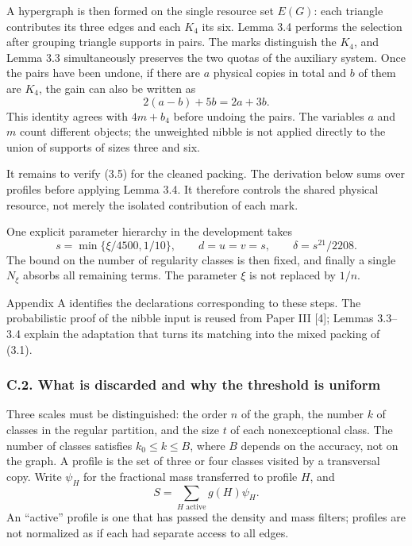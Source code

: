 \documentclass[english,11pt,a4paper]{article}
\newcounter{none}
\begin{document}
A hypergraph is then formed on the single resource set \(E(G)\): each triangle contributes its three edges and each \(K_4\) its six. Lemma 3.4 performs the selection after grouping triangle supports in pairs. The marks distinguish the \(K_4\), and Lemma 3.3 simultaneously preserves the two quotas of the auxiliary system. Once the pairs have been undone, if there are \(a\) physical copies in total and \(b\) of them are \(K_4\), the gain can also be written as \[
2(a-b)+5b=2a+3b.
\tag{3.9}
\] This identity agrees with \(4m+b_4\) before undoing the pairs. The variables \(a\) and \(m\) count different objects; the unweighted nibble is not applied directly to the union of supports of sizes three and six.

It remains to verify (3.5) for the cleaned packing. The derivation below sums over profiles before applying Lemma 3.4. It therefore controls the shared physical resource, not merely the isolated contribution of each mark.

One explicit parameter hierarchy in the development takes \[
s=\min\{\xi/4500,1/10\},\qquad
d=u=v=s,\qquad \delta=s^{21}/2208.
\] The bound on the number of regularity classes is then fixed, and finally a single \(N_\xi\) absorbs all remaining terms. The parameter \(\xi\) is not replaced by \(1/n\).

Appendix A identifies the declarations corresponding to these steps. The probabilistic proof of the nibble input is reused from Paper III {[}4{]}; Lemmas 3.3--3.4 explain the adaptation that turns its matching into the mixed packing of (3.1).

\subsubsection{C.2. What is discarded and why the threshold is uniform}\label{c.2.-what-is-discarded-and-why-the-threshold-is-uniform}

Three scales must be distinguished: the order \(n\) of the graph, the number \(k\) of classes in the regular partition, and the size \(t\) of each nonexceptional class. The number of classes satisfies \(k_0\le k\le B\), where \(B\) depends on the accuracy, not on the graph. A profile is the set of three or four classes visited by a transversal copy. Write \(\psi_H\) for the fractional mass transferred to profile \(H\), and \[
S=\sum_{H\text{ active}}g(H)\psi_H.
\] An ``active'' profile is one that has passed the density and mass filters; profiles are not normalized as if each had separate access to all edges.
\end{document}
